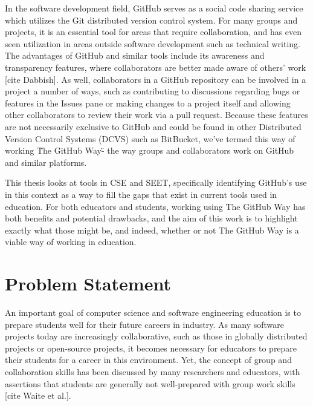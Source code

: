 In the software development field, GitHub serves as a social code sharing service which utilizes the Git distributed version control system. For many groups and projects, it is an essential tool for areas that require collaboration, and has even seen utilization in areas outside software development such as technical writing. The advantages of GitHub and similar tools include its awareness and transparency features, where collaborators are better made aware of others' work [cite Dabbish]. As well, collaborators in a GitHub repository can be involved in a project a number of ways, such as contributing to discussions regarding bugs or features in the Issues pane or making changes to a project itself and allowing other collaborators to review their work via a pull request. Because these features are not necessarily exclusive to GitHub and could be found in other Distributed Version Control Systems (DCVS) such as BitBucket, we've termed this way of working \"The GitHub Way\" - the way groups and collaborators work on GitHub and similar platforms. %

This thesis looks at tools in CSE and SEET, specifically identifying GitHub's use in this context as a way to fill the gaps that exist in current tools used in education. For both educators and students, working using The GitHub Way has both benefits and potential drawbacks, and the aim of this work is to highlight exactly what those might be, and indeed, whether or not The GitHub Way is a viable way of working in education.


\section{Problem Statement}
An important goal of computer science and software engineering education is to prepare students well for their future careers in industry. As many software projects today are increasingly collaborative, such as those in globally distributed projects or open-source projects, it becomes necessary for educators to prepare their students for a career in this environment. Yet, the concept of group and collaboration skills has been discussed by many researchers and educators, with assertions that students are generally not well-prepared with group work skills [cite Waite et al.].

